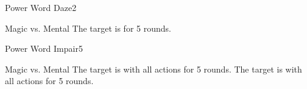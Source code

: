 \begin{spellsection}{Power Word Daze}{2}
    \begin{spellheader}
    \end{spellheader}
    \begin{spellcontent}
        \begin{spelltargetinginfo}
        \end{spelltargetinginfo}
        \begin{spelleffects}
            \begin{spellattack}{Magic vs. Mental}
                \spellsuccess The target is \dazed for 5 rounds.
            \end{spellattack}
        \end{spelleffects}
    \end{spellcontent}
    \begin{spellfooter}
        \miscastrandom
    \end{spellfooter}
\end{spellsection}

\begin{spellsection}{Power Word Impair}{5}
    \begin{spellheader}
    \end{spellheader}
    \begin{spellcontent}
        \begin{spelltargetinginfo}
        \end{spelltargetinginfo}
        \begin{spelleffects}
            \begin{spellattack}{Magic vs. Mental}
                \spellsuccess The target is \severelyimpaired with all actions for 5 rounds.
                \spellfailure The target is \impaired with all actions for 5 rounds.
            \end{spellattack}
        \end{spelleffects}
    \end{spellcontent}
    \begin{spellfooter}
        \miscastrandom
    \end{spellfooter}
\end{spellsection}

